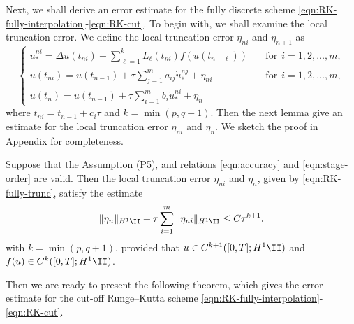Next, we shall derive an error estimate for the fully discrete scheme \eqref{eqn:RK-fully-interpolation}-\eqref{eqn:RK-cut}.
To begin with, we shall examine the local truncation error. We define the local truncation error $\eta_{ni}$ and $\eta_{n+1}$  as
\begin{equation}\label{eqn:RK-fully-trunc}
    \begin{cases}
    \dot u_*^{ni} = \Delta  u(t_{ni}) +
    \sum_{\ell=1}^k L_{\ell}(t_{ni}) f(u(t_{n-\ell}))&\quad \text{for} ~~i=1,2,\dots,m, \\ %
    u(t_{ni})=  u(t_{n-1}) + \tau \sum_{j=1}^m a_{ij} \dot u_*^{nj} + \eta_{ni}&\quad \text{for} ~~i=1,2,\dots,m, \\
    u(t_n) = u(t_{n-1}) + \tau \sum_{i=1}^m b_i \dot u_*^{ni} + \eta_{n}
  \end{cases}
\end{equation}
where $t_{ni}=t_{n-1}+c_i\tau$ and $k=\min(p,q+1)$.
Then the next lemma give an estimate for the local truncation error $\eta_{ni}$ and $\eta_{n}$.
We sketch the proof in Appendix for completeness.

\begin{lemma}\label{lem:RK-local-truncation}
Suppose that the Assumption (P5), and relations \eqref{eqn:accuracy} and \eqref{eqn:stage-order}
are valid. Then the local truncation error $\eta_{ni}$ and $\eta_{n}$, given by \eqref{eqn:RK-fully-trunc},
satisfy the estimate
\begin{equation*}
\| \eta_n \|_{H^1\II}  + \tau \sum_{i=1}^m  \| \eta_{ni} \|_{H^1\II}   \le C \tau^{k+1}.
\end{equation*}
with $k=\min(p,q+1)$, provided that $u\in C^{k+1}([0,T]; H^1\II)$ and $f(u) \in C^k([0,T]; H^1\II)$.
\end{lemma}

Then we are ready to present the following theorem, which gives the error estimate for the
cut-off Runge--Kutta scheme \eqref{eqn:RK-fully-interpolation}-\eqref{eqn:RK-cut}.

